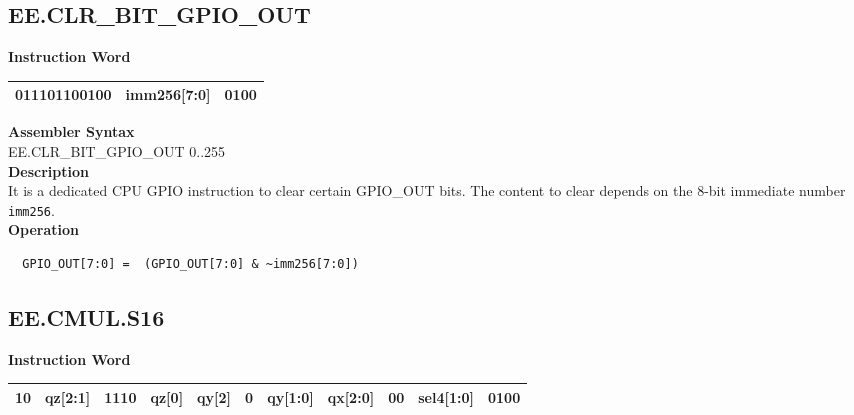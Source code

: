 \clearpage
\subsection{EE.CLR\_BIT\_GPIO\_OUT}\label{instruction:EECLRBITGPIOOUT}
\setlength\tabcolsep{6pt}
\textbf{Instruction Word} \\
\begin{tabular}{|c|c|c|}
	\hline
	011101100100 & imm256[7:0] & 0100 \\
	\hline
\end{tabular}

\textbf{Assembler Syntax} \\
EE.CLR\_BIT\_GPIO\_OUT 0..255 \\
\textbf{Description} \\
It is a dedicated CPU GPIO instruction to clear certain GPIO\_OUT bits. The content to clear depends on the 8-bit immediate number \lstinline{imm256}.\\
\textbf{Operation}
\begin{lstlisting}
  GPIO_OUT[7:0] =  (GPIO_OUT[7:0] & ~imm256[7:0])
\end{lstlisting}

\clearpage
\subsection{EE.CMUL.S16}\label{instruction:EECMULS16}
\setlength\tabcolsep{6pt}
\textbf{Instruction Word} \\
\begin{tabular}{|c|c|c|c|c|c|c|c|c|c|c|}
	\hline
	10 & qz[2:1] & 1110 & qz[0] & qy[2] & 0 & qy[1:0] & qx[2:0] & 00 & sel4[1:0] & 0100 \\
	\hline
\end{tabular}

